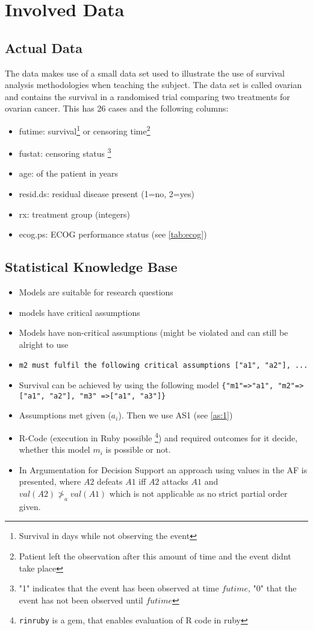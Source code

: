 {\color{gray}
\section{Involved Data}
\subsection{Actual Data}
The data makes use of a small data set used to illustrate the use of survival analysis methodologies when teaching the subject. The data set is called ovarian and contains the survival in a randomised trial comparing two treatments for ovarian cancer. This has 26 cases and the following columns:
\begin{itemize}

\item futime: survival\footnote{Survival in days while not observing the event} or censoring time\footnote{Patient left the observation after this amount of time and the event didnt take place}
\item fustat: censoring status \footnote{"1" indicates that the event has been observed at time $futime$, "0" that the event has not been observed until $futime$}
\item age: of the patient in years
\item resid.ds: residual disease present (1=no, 2=yes) 
\item rx: treatment group (integers)
\item ecog.ps: ECOG performance status (see \autoref{tab:ecog})
\end{itemize}

\subsection{Statistical Knowledge Base}
\begin{itemize}
	\item Models are suitable for research questions
	\item models have critical assumptions
	\item Models have non-critical assumptions (might be violated and can still be alright to use
	\item \texttt{m2 must fulfil the following critical assumptions ["a1", "a2"], ... }
	\item Survival can be achieved by using the following model \texttt{\{"m1"=>"a1", "m2"=>["a1", "a2"], "m3" =>["a1", "a3"]\}}
	\item Assumptions met given ($a_i$). Then we use AS1 (see \autoref{as:1})
	\item R-Code (execution in Ruby possible \cite{rinRuby}   \footnote{\texttt{rinruby} is a gem, that enables evaluation of R code in ruby}) and required outcomes for it decide, whether this model $m_i$ is possible or not. 
	\item In Argumentation for Decision Support\cite{Atkinson2006} an approach using values in the AF is presented, where $A2$ defeats $A1$ iff $A2$ attacks $A1$ and $val(A2) \ngtr_a val(A1)$ which is not applicable as no strict partial order given.
\end{itemize}

}